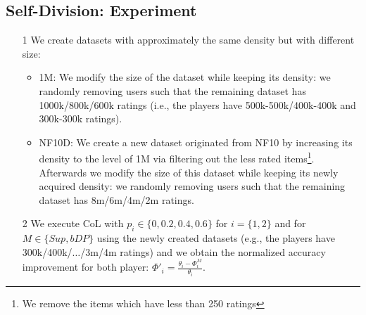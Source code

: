 \documentclass[USenglish,oneside,twocolumn]{article}
\theoremstyle{plain}
\begin{document}
\begin{appendices}
        
        
        \section{Self-Division: Experiment}
        \label{app:self}
        
        \begin{itemize}
            \item[1] We create datasets with approximately the same density but with different size:
            
            \begin{itemize}
                \item 1M: We modify the size of the dataset while keeping its density: we randomly removing users such that the remaining dataset has 1000k/800k/600k ratings (i.e., the players have 500k-500k/400k-400k and 300k-300k ratings).
                \item NF10D: We create a new dataset originated from NF10 by increasing its density to the level of 1M via filtering out the less rated items\footnote{We remove the items which have less than 250 ratings}. Afterwards we modify the size of this dataset while keeping its newly acquired density: we randomly removing users such that the remaining dataset has 8m/6m/4m/2m ratings.
            \end{itemize}
            
            \item[2] We execute CoL with $p_i\in\{0,0.2,0.4,0.6\}$ for $i=\{1,2\}$ and for $M\in\{Sup,bDP\}$ using the newly created datasets (e.g., the players have 300k/400k/$\dots$/3m/4m ratings) and we obtain the normalized accuracy improvement for both player: $\Phi'_i=\frac{\theta_i-\Phi_i^M}{\theta_i}$. 
            

\end{itemize}
\end{appendices}
\end{document}
